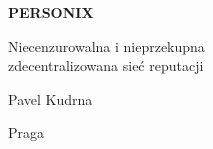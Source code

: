 \thispagestyle{empty}
\begin{center}
  {\sffamily\bfseries\fontsize{34}{40}\selectfont PERSONIX\par}
  \vspace{2.2em}
  {\rmfamily\large Niecenzurowalna i nieprzekupna\\[0.25em]
   zdecentralizowana sieć reputacji\par}
\end{center}
\begin{center}
  {\rmfamily\Large Pavel Kudrna\par}
  \vspace{0.45em}
  {\rmfamily\small Praga\quad\textbullet{}\par}
\end{center}
\clearpage
